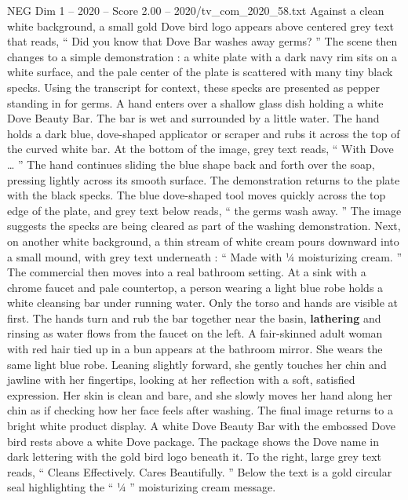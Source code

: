 \begin{textsample}{NEG Dim 1 – 2020 – Score 2.00 – 2020/tv\_com\_2020\_58.txt}  \label{ex:f1_neg_088}
Against a clean white background, a small gold Dove bird logo appears above centered grey text that reads, “ Did you know that Dove Bar washes away germs? ” The scene then changes to a simple demonstration : a white plate with a dark navy rim sits on a white surface, and the pale center of the plate is scattered with many tiny black specks.
Using the transcript for context, these specks are presented as pepper standing in for germs.
A hand enters over a shallow glass dish holding a white Dove Beauty Bar.
The bar is wet and surrounded by a little water.
The hand holds a dark blue, dove-shaped applicator or scraper and rubs it across the top of the curved white bar.
At the bottom of the image, grey text reads, “ With Dove … ” The hand continues sliding the blue shape back and forth over the soap, pressing lightly across its smooth surface.
The demonstration returns to the plate with the black specks.
The blue dove-shaped tool moves quickly across the top edge of the plate, and grey text below reads, “ the germs wash away. ” The image suggests the specks are being cleared as part of the washing demonstration.
Next, on another white background, a thin stream of white cream pours downward into a small mound, with grey text underneath : “ Made with ¼ moisturizing cream. ” The commercial then moves into a real bathroom setting.
At a sink with a chrome faucet and pale countertop, a person wearing a light blue robe holds a white cleansing bar under running water.
Only the torso and hands are visible at first.
The hands turn and rub the bar together near the basin, \textbf{lathering} and rinsing as water flows from the faucet on the left.
A fair-skinned adult woman with red hair tied up in a bun appears at the bathroom mirror.
She wears the same light blue robe.
Leaning slightly forward, she gently touches her chin and jawline with her fingertips, looking at her reflection with a soft, satisfied expression.
Her skin is clean and bare, and she slowly moves her hand along her chin as if checking how her face feels after washing.
The final image returns to a bright white product display.
A white Dove Beauty Bar with the embossed Dove bird rests above a white Dove package.
The package shows the Dove name in dark lettering with the gold bird logo beneath it.
To the right, large grey text reads, “ Cleans Effectively.
Cares Beautifully. ” Below the text is a gold circular seal highlighting the “ ¼ ” moisturizing cream message.

\end{textsample}
